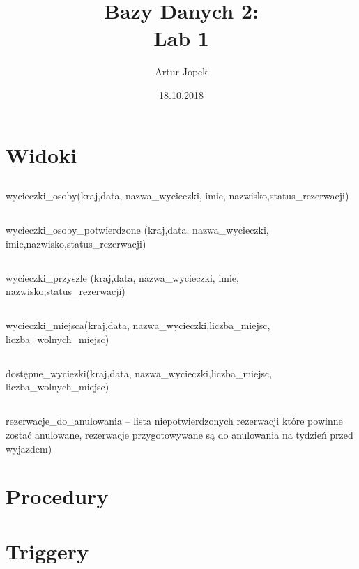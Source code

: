 \documentclass[12pt]{article}
\begin{document}
\title{Bazy Danych 2:\\Lab 1}
\author{Artur Jopek}
\date{18.10.2018}
\maketitle


\maketitle

\section{Widoki}
\subsection{}
wycieczki\_osoby(kraj,data, nazwa\_wycieczki, imie, nazwisko,status\_rezerwacji)

\subsection{}
wycieczki\_osoby\_potwierdzone (kraj,data, nazwa\_wycieczki, imie,nazwisko,status\_rezerwacji)

\subsection{}
wycieczki\_przyszle (kraj,data, nazwa\_wycieczki, imie, nazwisko,status\_rezerwacji)

\subsection{}
wycieczki\_miejsca(kraj,data, nazwa\_wycieczki,liczba\_miejsc, liczba\_wolnych\_miejsc)

\subsection{}
dostępne\_wyciezki(kraj,data, nazwa\_wycieczki,liczba\_miejsc, liczba\_wolnych\_miejsc)

\subsection{}
rezerwacje\_do\_anulowania – lista niepotwierdzonych rezerwacji które powinne zostać
anulowane, rezerwacje przygotowywane są do anulowania na tydzień przed wyjazdem)


\section{Procedury}


\section{Triggery}

\end{document}

